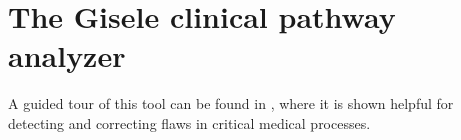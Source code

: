 \section{The Gisele clinical pathway analyzer\label{section:tool-clinical-pathway-analyzer}}

A guided tour of this tool can be found in \cite{Damas:2011}, where it is shown helpful for detecting and correcting flaws in critical medical processes.
